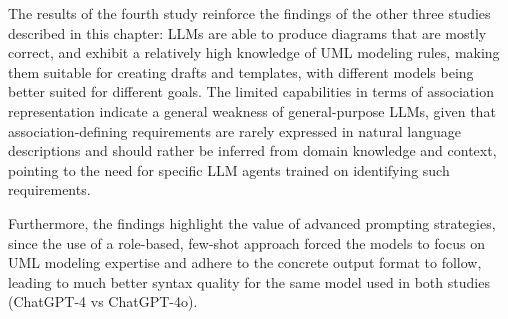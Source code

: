 The results of the fourth study reinforce the findings of the other three studies described in this chapter: LLMs are able to produce diagrams that are mostly correct, and exhibit a relatively high knowledge of UML modeling rules, making them suitable for creating drafts and templates, with different models being better suited for different goals. The limited capabilities in terms of association representation indicate a general weakness of general-purpose LLMs, given that association-defining requirements are rarely expressed in natural language descriptions and should rather be inferred from domain knowledge and context, pointing to the need for specific LLM agents trained on identifying such requirements.

Furthermore, the findings highlight the value of advanced prompting strategies, since the use of a role-based, few-shot approach forced the models to focus on UML modeling expertise and adhere to the concrete output format to follow, leading to much better syntax quality for the same model used in both studies (ChatGPT-4 vs ChatGPT-4o).


